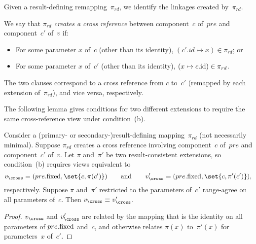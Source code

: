 Given a result-defining remapping~$\pi_{rd}$, we identify the linkages
created by~$\pi_{rd}$.  
%
\begin{definition}
We say that $\pi_{rd}$ \emph{creates a cross reference} between component~$c$
of~$pre$ and component~$c'$ of~$v$ if:
%
\begin{itemize}
\item For some parameter $x$ of~$c$ (other than its identity), $(c'.id \mapsto
x) \in \pi_{rd}$; or


\item For some parameter $x$ of~$c'$ (other than its identity), $(x \mapsto
c.\mathrm{id}) \in \pi_{rd}$.
\end{itemize}
\end{definition}
%
The two clauses correspond to a cross reference from $c$ to~$c'$ (remapped by
each extension of~$\pi_{rd}$), and vice versa, respectively.



The following lemma gives conditions for two different extensions to require
the same cross-reference view under condition~(b).
%
\begin{lemma}
\label{lem:singleRef:cond-b-extensions}
Consider a (primary- or secondary-)result-defining mapping~$\pi_{rd}$ (not
necessarily minimal).  Suppose $\pi_{rd}$ creates a cross reference involving
component~$c$ of~$pre$ and component~$c'$ of~$v$.  Let $\pi$ and~$\pi'$ be two
result-consistent extensions, so condition~(b) requires views equivalent to
\[
v_\cross  =  (pre.\fixed, \set{c, \pi(c')}) \qquad\mbox{and}\qquad
v_\cross'  =  (pre.\fixed, \set{c, \pi'(c')}),
\]
respectively.  Suppose $\pi$ and~$\pi'$ restricted to the parameters of~$c'$
range-agree on all parameters of~$c$.  Then $v_\cross \equiv v_\cross'$.
\end{lemma}
%
\begin{proof}
$v_\cross$ and $v_\cross'$ are related by the mapping that is the identity on
  all parameters of $pre.\mathrm{fixed}$ and~$c$, and otherwise relates $\pi(x)$
  to~$\pi'(x)$ for parameters~$x$ of~$c'$.
\end{proof}

